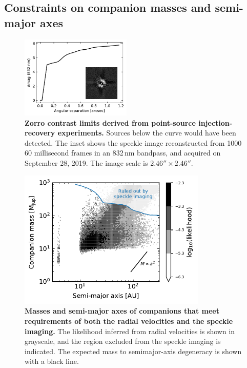 \documentclass[12pt,twocolumn,tighten]{aastex62}
\begin{document}
\subsection{Constraints on companion masses and semi-major axes}

\begin{figure}[!t]
	\begin{center}
		\leavevmode
		\includegraphics[width=0.47\textwidth]{f3.pdf}
	\end{center}
	\vspace{-0.7cm}
    \caption{
      {\bf Zorro contrast limits derived from point-source
      injection-recovery experiments.} Sources below the curve would
      have been detected.  The inset shows the speckle image
      reconstructed from 1000 60 millisecond frames in an 832$\,$nm
      bandpass, and acquired on September 28, 2019.  The image scale
      is $2.46''\times2.46''$.
    }
    \label{fig:zorro}
\end{figure}

\begin{figure}[t]
	\begin{center}
		\leavevmode
		\includegraphics[width=0.8\textwidth]{f4.pdf}
	\end{center}
	\vspace{-0.6cm}
	\caption{
    {\bf Masses and semi-major axes of companions that meet
    requirements of both the radial velocities and the speckle
    imaging.} The likelihood inferred from radial velocities is shown
    in grayscale, and the region excluded from the speckle imaging is
    indicated.  The expected mass to semimajor-axis degeneracy is
    shown with a black line.
	\label{fig:mass_sma}
  \vspace{-0cm}
	}
\end{figure}
\end{document}
